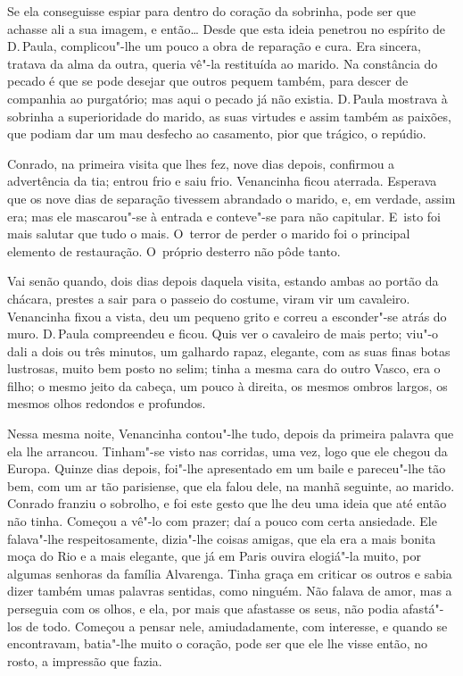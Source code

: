 \begin{linenumbers}
Se ela conseguisse espiar para dentro do coração da sobrinha, pode ser
que achasse ali a sua imagem, e então\ldots{} Desde que esta ideia penetrou
no espírito de D.\,Paula, complicou"-lhe um pouco a obra de reparação e
cura. Era sincera, tratava da alma da outra, queria vê"-la restituída ao
marido. Na constância do pecado é que se pode desejar que outros pequem
também, para descer de companhia ao purgatório; mas aqui o pecado já não
existia. D.\,Paula mostrava à sobrinha a superioridade do marido, as suas
virtudes e assim também as paixões, que podiam dar um mau desfecho ao
casamento, pior que trágico, o repúdio.

Conrado, na primeira visita que lhes fez, nove dias depois, confirmou a
advertência da tia; entrou frio e saiu frio. Venancinha ficou aterrada.
Esperava que os nove dias de separação tivessem abrandado o marido, e,
em verdade, assim era; mas ele mascarou"-se à entrada e conteve"-se para
não capitular. E~isto foi mais salutar que tudo o mais. O~terror de
perder o marido foi o principal elemento de restauração. O~próprio
desterro não pôde tanto.

Vai senão quando, dois dias depois daquela visita, estando ambas ao
portão da chácara, prestes a sair para o passeio do costume, viram vir
um cavaleiro. Venancinha fixou a vista, deu um pequeno grito e correu a
esconder"-se atrás do muro. D.\,Paula compreendeu e ficou. Quis ver o
cavaleiro de mais perto; viu"-o dali a dois ou três minutos, um galhardo
rapaz, elegante, com as suas finas botas lustrosas, muito bem posto no
selim; tinha a mesma cara do outro Vasco, era o filho; o mesmo jeito da
cabeça, um pouco à direita, os mesmos ombros largos, os mesmos olhos
redondos e profundos.

Nessa mesma noite, Venancinha contou"-lhe tudo, depois da primeira
palavra que ela lhe arrancou. Tinham"-se visto nas corridas, uma vez,
logo que ele chegou da Europa. Quinze dias depois, foi"-lhe apresentado
em um baile e pareceu"-lhe tão bem, com um ar tão parisiense, que ela
falou dele, na manhã seguinte, ao marido. Conrado franziu o sobrolho, e
foi este gesto que lhe deu uma ideia que até então não tinha. Começou a
vê"-lo com prazer; daí a pouco com certa ansiedade. Ele falava"-lhe
respeitosamente, dizia"-lhe coisas amigas, que ela era a mais bonita moça
do Rio e a mais elegante, que já em Paris ouvira elogiá"-la muito, por
algumas senhoras da família Alvarenga. Tinha graça em criticar os outros
e sabia dizer também umas palavras sentidas, como ninguém. Não falava de
amor, mas a perseguia com os olhos, e ela, por mais que afastasse os
seus, não podia afastá"-los de todo. Começou a pensar nele,
amiudadamente, com interesse, e quando se encontravam, batia"-lhe muito o
coração, pode ser que ele lhe visse então, no rosto, a impressão que
fazia.


\end{linenumbers}
